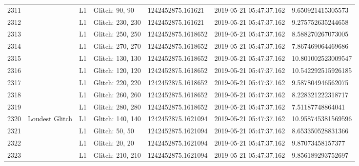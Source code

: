 \begin{longtable}{lllllll}
2311 &                                                    &       L1 &    Glitch: 90, 90 &   1242452875.161621 &  2019-05-21 05:47:37.162 &   9.650921415305573 \\
2312 &                                                    &       L1 &  Glitch: 230, 230 &   1242452875.161621 &  2019-05-21 05:47:37.162 &   9.275752635244658 \\
2313 &                                                    &       L1 &  Glitch: 250, 250 &  1242452875.1618652 &  2019-05-21 05:47:37.162 &   8.588270267073005 \\
2314 &                                                    &       L1 &  Glitch: 270, 270 &  1242452875.1618652 &  2019-05-21 05:47:37.162 &   7.867469064469686 \\
2315 &                                                    &       L1 &  Glitch: 130, 130 &  1242452875.1618652 &  2019-05-21 05:47:37.162 &  10.801002523009547 \\
2316 &                                                    &       L1 &  Glitch: 120, 120 &  1242452875.1618652 &  2019-05-21 05:47:37.162 &  10.542292515926185 \\
2317 &                                                    &       L1 &  Glitch: 220, 220 &  1242452875.1618652 &  2019-05-21 05:47:37.162 &   9.587804946562075 \\
2318 &                                                    &       L1 &  Glitch: 260, 260 &  1242452875.1618652 &  2019-05-21 05:47:37.162 &   8.228321222318717 \\
2319 &                                                    &       L1 &  Glitch: 280, 280 &  1242452875.1618652 &  2019-05-21 05:47:37.162 &    7.51187748864041 \\
2320 &                                     Loudest Glitch &       L1 &  Glitch: 140, 140 &  1242452875.1621094 &  2019-05-21 05:47:37.162 &  10.958745381569596 \\
2321 &                                                    &       L1 &    Glitch: 50, 50 &  1242452875.1621094 &  2019-05-21 05:47:37.162 &   8.653350528831366 \\
2322 &                                                    &       L1 &    Glitch: 20, 20 &  1242452875.1621094 &  2019-05-21 05:47:37.162 &    9.87073458157377 \\
2323 &                                                    &       L1 &  Glitch: 210, 210 &  1242452875.1621094 &  2019-05-21 05:47:37.162 &   9.856189293752697 \\

\end{longtable}
